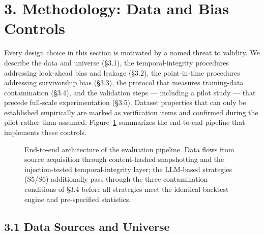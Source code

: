 \documentclass[
  12pt,
]{article}
\begin{document}
\hypertarget{methodology-data-and-bias-controls}{%
\section{3. Methodology: Data and Bias
Controls}\label{methodology-data-and-bias-controls}}

Every design choice in this section is motivated by a named threat to
validity. We describe the data and universe (§3.1), the
temporal-integrity procedures addressing look-ahead bias and leakage
(§3.2), the point-in-time procedures addressing survivorship bias
(§3.3), the protocol that measures training-data contamination (§3.4),
and the validation steps --- including a pilot study --- that precede
full-scale experimentation (§3.5). Dataset properties that can only be
established empirically are marked as verification items and confirmed
during the pilot rather than assumed. Figure~\ref{fig:pipeline} summarizes the end-to-end pipeline that implements these controls.

\begin{figure}[htbp]
\centering
\resizebox{\linewidth}{!}{}
\caption{End-to-end architecture of the evaluation pipeline. Data flows from source acquisition through content-hashed snapshotting and the injection-tested temporal-integrity layer; the LLM-based strategies (S5/S6) additionally pass through the three contamination conditions of §3.4 before all strategies meet the identical backtest engine and pre-specified statistics.}
\label{fig:pipeline}
\end{figure}



\hypertarget{data-sources-and-universe}{%
\subsection{3.1 Data Sources and
Universe}\label{data-sources-and-universe}}
\end{document}
